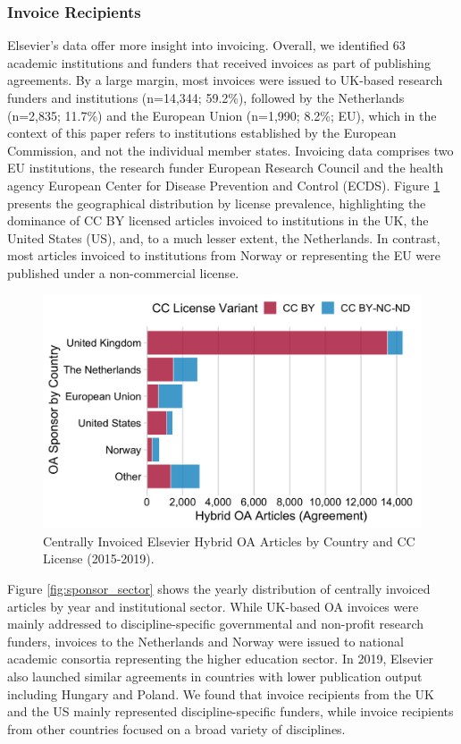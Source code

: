 \documentclass[a4paper,man,floatsintext,longtable,noextraspace,12pt]{apa6}
\begin{document}
\hypertarget{invoice-recipients}{%
\subsubsection*{Invoice Recipients}\label{invoice-recipients}}

Elsevier's data offer more insight into invoicing. Overall, we
identified 63 academic institutions and funders that received invoices
as part of publishing agreements. By a large margin, most invoices were
issued to UK-based research funders and institutions (n=14,344; 59.2\%),
followed by the Netherlands (n=2,835; 11.7\%) and the European Union
(n=1,990; 8.2\%; EU), which in the context of this paper refers to
institutions established by the European Commission, and not the
individual member states. Invoicing data comprises two EU institutions,
the research funder European Research Council and the health agency
European Center for Disease Prevention and Control (ECDS). Figure
\ref{fig:invoice_sponsor_country} presents the geographical distribution
by license prevalence, highlighting the dominance of CC BY licensed
articles invoiced to institutions in the UK, the United States (US),
and, to a much lesser extent, the Netherlands. In contrast, most
articles invoiced to institutions from Norway or representing the EU
were published under a non-commercial license.

\begin{figure}[H]

{\centering \includegraphics[width=0.7\linewidth,]{manuscript_files/figure-latex/invoice_sponsor_country-1} 

}

\caption{Centrally Invoiced Elsevier Hybrid OA Articles by Country and CC License (2015-2019).}\label{fig:invoice_sponsor_country}
\end{figure}

Figure \ref{fig:sponsor_sector} shows the yearly distribution of
centrally invoiced articles by year and institutional sector. While
UK-based OA invoices were mainly addressed to discipline-specific
governmental and non-profit research funders, invoices to the
Netherlands and Norway were issued to national academic consortia
representing the higher education sector. In 2019, Elsevier also
launched similar agreements in countries with lower publication output
including Hungary and Poland. We found that invoice recipients from the
UK and the US mainly represented discipline-specific funders, while
invoice recipients from other countries focused on a broad variety of
disciplines.
\end{document}

